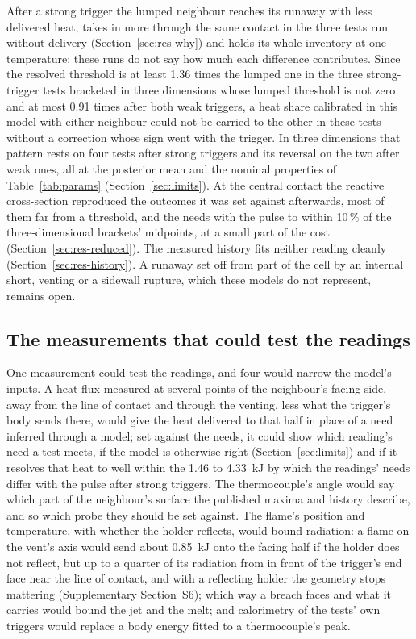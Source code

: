 \documentclass[preprint,12pt]{elsarticle}
\begin{document}
After a strong trigger the lumped neighbour reaches its runaway with less delivered heat, takes in more through the same contact in the three tests run without delivery (Section~\ref{sec:res-why}) and holds its whole inventory at one temperature; these runs do not say how much each difference contributes. Since the resolved threshold is at least 1.36 times the lumped one in the three strong-trigger tests bracketed in three dimensions whose lumped threshold is not zero and at most 0.91 times after both weak triggers, a heat share calibrated in this model with either neighbour could not be carried to the other in these tests without a correction whose sign went with the trigger. In three dimensions that pattern rests on four tests after strong triggers and its reversal on the two after weak ones, all at the posterior mean and the nominal properties of Table~\ref{tab:params} (Section~\ref{sec:limits}). At the central contact the reactive cross-section reproduced the outcomes it was set against afterwards, most of them far from a threshold, and the needs with the pulse to within 10\,\% of the three-dimensional brackets' midpoints, at a small part of the cost (Section~\ref{sec:res-reduced}). The measured history fits neither reading cleanly (Section~\ref{sec:res-history}). A runaway set off from part of the cell by an internal short, venting or a sidewall rupture, which these models do not represent, remains open.

\subsection{The measurements that could test the readings}
\label{sec:disc-measure}

One measurement could test the readings, and four would narrow the model's inputs. A heat flux measured at several points of the neighbour's facing side, away from the line of contact and through the venting, less what the trigger's body sends there, would give the heat delivered to that half in place of a need inferred through a model; set against the needs, it could show which reading's need a test meets, if the model is otherwise right (Section~\ref{sec:limits}) and if it resolves that heat to well within the 1.46 to 4.33~kJ by which the readings' needs differ with the pulse after strong triggers. The thermocouple's angle would say which part of the neighbour's surface the published maxima and history describe, and so which probe they should be set against. The flame's position and temperature, with whether the holder reflects, would bound radiation: a flame on the vent's axis would send about 0.85~kJ onto the facing half if the holder does not reflect, but up to a quarter of its radiation from in front of the trigger's end face near the line of contact, and with a reflecting holder the geometry stops mattering (Supplementary Section~S6); which way a breach faces and what it carries would bound the jet and the melt; and calorimetry of the tests' own triggers would replace a body energy fitted to a thermocouple's peak.
\end{document}

